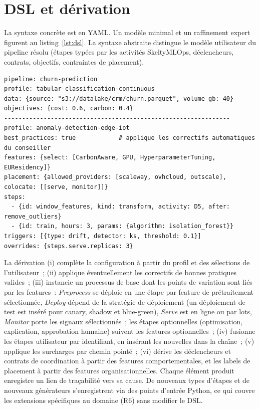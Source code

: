 \documentclass[10pt,a4paper]{article}
\begin{document}
\section{DSL et dérivation}
La syntaxe concrète est en YAML. Un modèle minimal et un raffinement expert figurent
au listing~\ref{lst:dsl}. La syntaxe abstraite distingue le modèle utilisateur du
pipeline résolu (étapes typées par les activités SkeltyMLOps, déclencheurs, contrats,
objectifs, contraintes de placement).

\begin{lstlisting}[style=yaml,caption={Modèle non expert (haut) et extrait d'un modèle expert (bas).},label=lst:dsl]
pipeline: churn-prediction
profile: tabular-classification-continuous
data: {source: "s3://datalake/crm/churn.parquet", volume_gb: 40}
objectives: {cost: 0.6, carbon: 0.4}
---------------------------------------------------------------
profile: anomaly-detection-edge-iot
best_practices: true            # applique les correctifs automatiques du conseiller
features: {select: [CarbonAware, GPU, HyperparameterTuning, EUResidency]}
placement: {allowed_providers: [scaleway, ovhcloud, outscale], colocate: [[serve, monitor]]}
steps:
  - {id: window_features, kind: transform, activity: D5, after: remove_outliers}
  - {id: train, hours: 3, params: {algorithm: isolation_forest}}
triggers: [{type: drift, detector: ks, threshold: 0.1}]
overrides: {steps.serve.replicas: 3}
\end{lstlisting}

La dérivation (i) complète la configuration à partir du profil et des sélections de
l'utilisateur~; (ii) applique éventuellement les correctifs de bonnes pratiques
valides~; (iii) instancie un processus de base dont les points de variation sont liés
par les features~: \emph{Preprocess} se déploie en une étape par feature de
prétraitement sélectionnée, \emph{Deploy} dépend de la stratégie de déploiement (un
déploiement de test est inséré pour canary, shadow et blue-green), \emph{Serve} est en
ligne ou par lots, \emph{Monitor} porte les signaux sélectionnés~; les étapes
optionnelles (optimisation, explication, approbation humaine) suivent les features
optionnelles~; (iv) fusionne les étapes utilisateur par identifiant, en insérant les
nouvelles dans la chaîne~; (v) applique les surcharges par chemin pointé~; (vi) dérive
les déclencheurs et contrats de coordination à partir des features comportementales,
et les labels de placement à partir des features organisationnelles. Chaque élément
produit enregistre un lien de traçabilité vers sa cause. De nouveaux types d'étapes et
de nouveaux générateurs s'enregistrent via des points d'entrée Python, ce qui couvre
les extensions spécifiques au domaine (R6) sans modifier le DSL.
\end{document}
